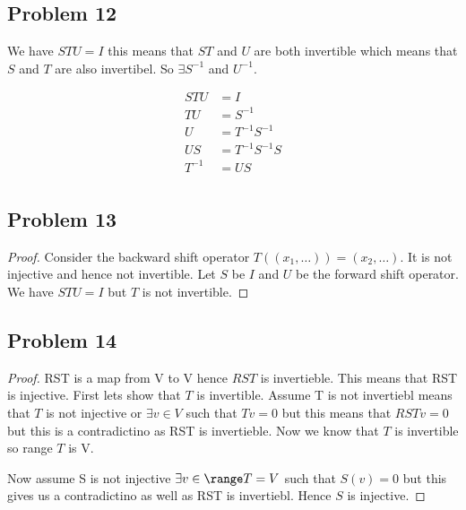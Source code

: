 \documentclass[a4paper]{report}
\begin{document}
\subsection*{Problem 12}
We have $STU = I$ this means that $ST$ and  $U$ are both invertible which means that $S$ and $T$ are also invertibel. So $\exists S^{-1}$ and $U^{-1}$.

\begin{align*}
    STU &= I\\
    TU &= S^{-1}\\
    U &= T^{-1}S^{-1}\\
    US &= T^{-1}S^{-1}S\\
    T^{-1} &= US\\
\end{align*}


\subsection*{Problem 13}
\begin{proof}
    Consider the backward shift operator $T((x_1,\dots)) = (x_2,\dots)$. It is not injective and hence not invertible. Let $S$ be $I$ and $U$ be the forward shift operator. We have $STU = I$ but $T$ is not invertible.
\end{proof}
\subsection*{Problem 14}
\begin{proof}
    RST is a map from V to V hence $RST$ is invertieble. This means that RST is injective. First lets show that  $T$ is invertible. Assume T is not invertiebl means that $T$ is not injective or $\exists v \in V$ such that $Tv = 0$ but this means that $RSTv = 0$ but this is a contradictino as RST is invertieble.  Now we know that $T$ is invertible so range $T$ is V.

    Now assume S is not injective $\exists v \in \range T = V$ such that $S(v) = 0$ but this gives us a contradictino as well as RST  is invertiebl. Hence $S$ is injective.

\end{proof}
\end{document}
